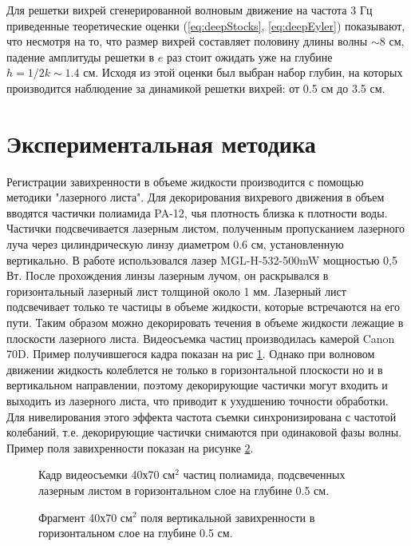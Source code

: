 Для решетки вихрей сгенерированной волновым движение на частота 3 Гц приведенные теоретические оценки (\ref{eq:deepStocks}, \ref{eq:deepEyler}) показывают, что несмотря на то, что размер вихрей составляет половину длины волны $\sim 8$ см, падение амплитуды решетки в $e$ раз стоит ожидать уже на глубине $h = 1/2k \sim 1.4$ см. Исходя из этой оценки был выбран набор глубин, на которых производится наблюдение за динамикой решетки вихрей: от 0.5 см до 3.5 см.


\section{Экспериментальная методика} \label{sect6_2}
Регистрации завихренности в объеме жидкости производится с помощью методики "лазерного листа". Для декорирования вихревого движения в объем вводятся частички полиамида PA-12, чья плотность близка к плотности воды. Частички подсвечивается лазерным листом, полученным пропусканием лазерного луча через цилиндрическую линзу диаметром 0.6 см, установленную вертикально. В работе использовался лазер MGL-H-532-500mW мощностью 0,5 Вт. После прохождения линзы лазерным лучом, он раскрывался в горизонтальный лазерный лист толщиной около 1 мм. Лазерный лист подсвечивает только те частицы в объеме жидкости, которые встречаются на его пути. Таким образом можно декорировать течения в объеме жидкости лежащие в плоскости лазерного листа. Видеосъемка частиц производилась камерой Canon 70D. Пример получившегося кадра показан на рис \ref{img:track0p5cm}. Однако при волновом движении жидкость колеблется не только в горизонтальной плоскости но и в вертикальном направлении, поэтому декорирующие частички могут входить и выходить из лазерного листа, что приводит к ухудшению точности обработки. Для нивелирования этого эффекта частота съемки синхронизирована с частотой колебаний, т.е. декорирующие частички снимаются при одинаковой фазы волны. Пример поля завихренности показан на рисунке \ref{img:vort0p5cm}.
\begin{figure}[ht]
  \caption{Кадр видеосъемки 40х70 см$^2$ частиц полиамида, подсвеченных лазерным листом в горизонтальном слое на глубине 0.5 см.}
  \label{img:track0p5cm}  
\end{figure}

\begin{figure}[ht]
  \caption{Фрагмент 40х70 см$^2$ поля вертикальной завихренности в горизонтальном слое на глубине 0.5 см.}
  \label{img:vort0p5cm}  
\end{figure}


